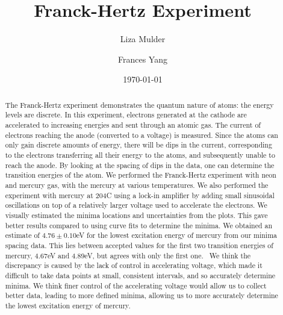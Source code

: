 \documentclass[prb,preprint]{revtex4-1}
\begin{document}

\title{Franck-Hertz Experiment}


\author{Liza Mulder}


\author{Frances Yang}


\date{\today}



\begin{abstract}
The Franck-Hertz experiment demonstrates the quantum nature of atoms: the energy levels are discrete. 
In this experiment, electrons generated at the cathode are accelerated to increasing energies and sent through an atomic gas. The current of electrons reaching the anode (converted to a voltage) is measured. 
Since the atoms can only gain discrete amounts of energy, there will be dips in the current, corresponding to the electrons transferring all their energy to the atoms, and subsequently unable to reach the anode.
By looking at the spacing of dips in the data, one can determine the transition energies of the atom. 
We performed the Franck-Hertz experiment with neon and mercury gas, with the mercury at various temperatures. 
We also performed the experiment with mercury at 204\degree C using a lock-in amplifier by adding small sinusoidal oscillations on top of a relatively larger voltage used to accelerate the electrons.
We visually estimated the minima locations and uncertainties from the plots. 
This gave better results compared to using curve fits to determine the minima.
We obtained an estimate of $4.76\pm 0.10$eV for the lowest excitation energy of mercury from our minima spacing data.
This lies between accepted values for the first two transition energies of mercury,  $4.67$eV and $4.89$eV, but agrees with only the first one.~\cite{new}
We think the discrepancy is caused by the lack of control in accelerating voltage, which made it difficult to take data points at small, consistent intervals, and so accurately determine minima.
We think finer control of the accelerating voltage would allow us to collect better data, leading to more defined minima, allowing us to more accurately determine the lowest excitation energy of mercury. 
\end{abstract}
\end{document}
